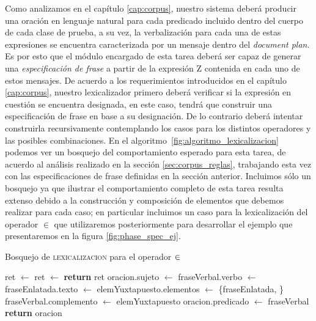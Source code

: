 Como analizamos en el capítulo \ref{cap:corpus}, nuestro sistema deberá producir una oración en lenguaje natural para cada predicado incluido dentro del cuerpo de cada clase de prueba, a su vez, la verbalización para cada una de estas expresiones se encuentra caracterizada por un mensaje dentro del \textit{document plan}. Es por esto que el módulo encargado de esta tarea deberá ser capaz de generar una \emph{especificación de frase} a partir de la expresión Z contenida en cada uno de estos mensajes. De acuerdo a los requerimientos introducidos en el capítulo \ref{cap:corpus}, nuestro lexicalizador primero deberá verificar si la expresión en cuestión se encuentra designada, en este caso, tendrá que construir una especificación de frase en base a su designación. De lo contrario deberá intentar construirla recursivamente contemplando los casos para los distintos operadores y las posibles combinaciones. En el algoritmo~\ref{fig:algoritmo_lexicalizacion} podemos ver un bosquejo del comportamiento esperado para esta tarea, de acuerdo al análisis realizado en la sección \ref{sec:corpus_reglas}, trabajando esta vez con las especificaciones de frase definidas en la sección anterior. Incluimos sólo un bosquejo ya que ilustrar el comportamiento completo de esta tarea resulta extenso debido a la construcción y composición de elementos que debemos realizar para cada caso; en particular incluimos un caso para la lexicalización del operador $\in$ que utilizaremos posteriormente para desarrollar el ejemplo que presentaremos en la figura \ref{fig:phase_spec_ej}.

\begin{algorithm}[H]
\caption{Bosquejo de \textsc{lexicalizacion} para el operador $\protect\in$}
\label{fig:algoritmo_lexicalizacion}
\begin{algorithmic}[1]
\State ret $\gets$ 
\Else
\State ret $\gets$ 
\EndIf
\State \textbf{return} ret
\EndFunction
\Statex
{}
\State oracion.sujeto $\gets$ 
\State fraseVerbal.verbo $\gets$ 
\State fraseEnlatada.texto $\gets$ 
\State elemYuxtapuesto.elementos $\gets$ \{fraseEnlatada, \}
\State fraseVerbal.complemento $\gets$ elemYuxtapuesto
\State oracion.predicado $\gets$ fraseVerbal
\State \textbf{return} oracion
\EndFunction
\end{algorithmic}
\end{algorithm}


